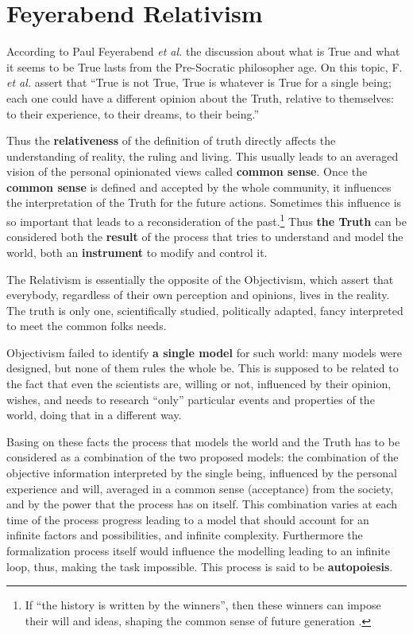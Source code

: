 \section{Feyerabend Relativism}

According to Paul Feyerabend \textit{et al.} \cite{PF} the discussion about what is True
and what it seems to be True lasts from the Pre-Socratic philosopher age.
On this topic, F. \textit{et al.} assert that ``True is not True, True is whatever is True for
a single being; each one could have a different opinion about the Truth, relative
to themselves: to their experience, to their dreams, to their being.''

Thus the \textbf{relativeness} of the definition of truth directly affects the
understanding of reality, the ruling and living. This usually  leads to
an averaged vision of the personal opinionated views called \textbf{common sense}.
Once the \textbf{common sense} is defined and accepted by the whole community,
it influences the interpretation of the Truth for the future actions.
Sometimes this influence is so important that leads to a reconsideration of the
past.\footnote{If ``the history is written by the winners'', then these winners can impose their will and ideas, shaping the common sense of future generation
.}
Thus \textbf{the Truth} can be considered both the \textbf{result} of the
process that tries to understand and model the world, both an
\textbf{instrument} to modify and control it.

The Relativism is essentially the opposite of the Objectivism, which assert that
everybody, regardless of their own perception and opinions, lives in the reality.
The truth is only one, scientifically studied, politically adapted, fancy
interpreted to meet the common folks needs.\cite{PF}

Objectivism failed to identify \textbf{a single model} for such world: many models were designed, but none of them rules the whole be.
This is supposed to be related to the fact that even the scientists are, willing
or not, influenced by their opinion, wishes, and needs to research ``only'' particular events and properties of the world, doing that in a different way.

Basing on these facts the process that models the world and the Truth has to be considered as
a combination of the two proposed models: the combination of the objective
information interpreted by the single being, influenced by the personal
experience and will, averaged in a common sense (acceptance) from the society,
and by the power that the process has on itself.
This combination varies at each time of the process progress leading to
a model that should account for an infinite factors and possibilities,
and infinite complexity. Furthermore  the formalization process itself would influence
the modelling leading to an infinite loop, thus, making the task impossible.
This process is said to be \textbf{autopoiesis}.

